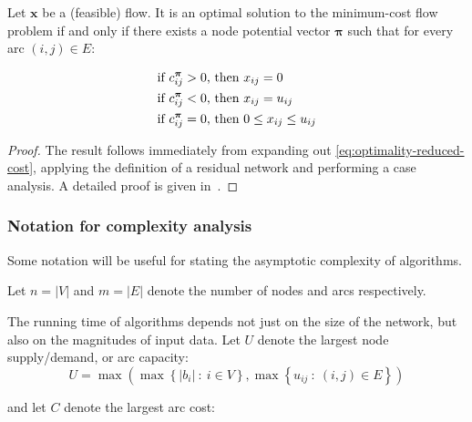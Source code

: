 \begin{thm} \label{thm:optimality-complementary-slackness}
Let $\mathbf{x}$ be a (feasible) flow. It is an optimal solution to the minimum-cost flow problem if and only if there exists a node potential vector $\boldsymbol{\pi}$ such that for every arc $(i,j)\in E$:

\normalfont %
\begin{subequations} \label{eq:optimality-complementary-slackness}
\begin{align} 
\text{if \ensuremath{c_{ij}^{\boldsymbol{\pi}}>0}, } & \text{then \ensuremath{x_{ij}=0}} \\
\text{if \ensuremath{c_{ij}^{\boldsymbol{\pi}}<0}, } & \text{then \ensuremath{x_{ij}=u_{ij}}} \\
\text{if \ensuremath{c_{ij}^{\boldsymbol{\pi}}=0}, } & \text{then \ensuremath{0\leq x_{ij}\leq  u_{ij}}}
\end{align}
\end{subequations}
\end{thm}
\begin{proof}
The result follows immediately from expanding out \cref{eq:optimality-reduced-cost}, applying the definition of a residual network and performing a case analysis. A detailed proof is given in~\cite[p.~310]{Ahuja:1993}.
\end{proof}

\subsubsection{Notation for complexity analysis} \label{sec:prep-flow-complexity}


Some notation will be useful for stating the asymptotic complexity of algorithms. 

Let $n=|V|$ and $m=|E|$ denote the number of nodes and arcs respectively.

The running time of algorithms depends not just on the size of the
network, but also on the magnitudes of input data. Let $U$ denote
the largest node supply/demand, or arc capacity:
\begin{equation}
U=\max\left(\max\left\{ |b_{i}|\::\: i\in V\right\} ,\max\left\{ u_{ij}\::\:\left(i,j\right)\in E\right\} \right)
\end{equation}

and let $C$ denote the largest arc cost:

